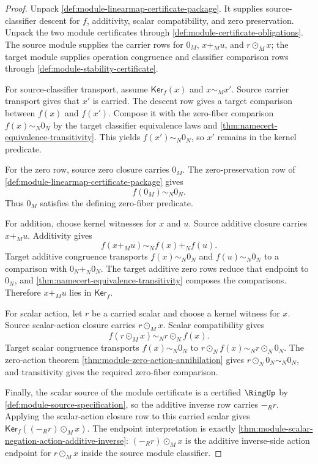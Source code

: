 \begin{proof}
Unpack \autoref{def:module-linearmap-certificate-package}. It supplies source-classifier descent for $f$, additivity, scalar compatibility, and zero preservation. Unpack the two module certificates through \autoref{def:module-certificate-obligations}. The source module supplies the carrier rows for $0_M$, $x+_M u$, and $r\odot_M x$; the target module supplies operation congruence and classifier comparison rows through \autoref{def:module-stability-certificate}.

For source-classifier transport, assume $\mathsf{Ker}_f(x)$ and $x\sim_Mx'$. Source carrier transport gives that $x'$ is carried. The descent row gives a target comparison between $f(x)$ and $f(x')$. Compose it with the zero-fiber comparison $f(x)\sim_N0_N$ by the target classifier equivalence laws and \autoref{thm:namecert-equivalence-transitivity}. This yields $f(x')\sim_N0_N$, so $x'$ remains in the kernel predicate.

For the zero row, source zero closure carries $0_M$. The zero-preservation row of \autoref{def:module-linearmap-certificate-package} gives
$$
f(0_M)\sim_N0_N.
$$
Thus $0_M$ satisfies the defining zero-fiber predicate.

For addition, choose kernel witnesses for $x$ and $u$. Source additive closure carries $x+_M u$. Additivity gives
$$
f(x+_M u)\sim_Nf(x)+_Nf(u).
$$
Target additive congruence transports $f(x)\sim_N0_N$ and $f(u)\sim_N0_N$ to a comparison with $0_N+_N0_N$. The target additive zero rows reduce that endpoint to $0_N$, and \autoref{thm:namecert-equivalence-transitivity} composes the comparisons. Therefore $x+_M u$ lies in $\mathsf{Ker}_f$.

For scalar action, let $r$ be a carried scalar and choose a kernel witness for $x$. Source scalar-action closure carries $r\odot_M x$. Scalar compatibility gives
$$
f(r\odot_M x)\sim_N r\odot_N f(x).
$$
Target scalar congruence transports $f(x)\sim_N0_N$ to $r\odot_N f(x)\sim_N r\odot_N0_N$. The zero-action theorem \autoref{thm:module-zero-action-annihilation} gives $r\odot_N0_N\sim_N0_N$, and transitivity gives the required zero-fiber comparison.

Finally, the scalar source of the module certificate is a certified $\RingUp$ by \autoref{def:module-source-specification}, so the additive inverse row carries $-_R r$. Applying the scalar-action closure row to this carried scalar gives $\mathsf{Ker}_f((-_R r)\odot_M x)$. The endpoint interpretation is exactly \autoref{thm:module-scalar-negation-action-additive-inverse}: $(-_R r)\odot_M x$ is the additive inverse-side action endpoint for $r\odot_M x$ inside the source module classifier.
\end{proof}

